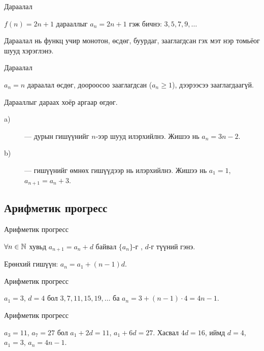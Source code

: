 \begin{frame}[allowframebreaks]{Дараалал}
\begin{example}
$f(n)=2n+1$ дарааллыг $a_n=2n+1$ гэж бичнэ: $3,5,7,9,\ldots$
\end{example}

 Дараалал нь функц учир монотон, өсдөг, буурдаг, зааглагдсан гэх мэт
нэр томьёог шууд хэрэглэнэ.
\end{frame}

\begin{frame}[allowframebreaks]{Дараалал}
\begin{example}
$a_n=n$ дараалал өсдөг, доороосоо зааглагдсан ($a_n\ge1$), дээрээсээ зааглагдаагүй.
\end{example}

Дарааллыг дараах хоёр аргаар өгдөг.
\begin{description}
  \item[a)]  — дурын гишүүнийг $n$-ээр шууд илэрхийлнэ.
            Жишээ нь $a_n=3n-2$.
  \item[b)]  — гишүүнийг өмнөх гишүүдээр нь илэрхийлнэ.
            Жишээ нь $a_1=1$, $a_{n+1}=a_n+3$.
\end{description}
\end{frame}

\subsection{Арифметик прогресс}
\begin{frame}[allowframebreaks]{Арифметик прогресс}
\begin{definition}
$\forall n\in\mathbb{N}$ хувьд $a_{n+1}=a_n+d$ байвал $\{a_n\}$-г ,
$d$-г түүний  гэнэ.
\end{definition}

Ерөнхий гишүүн: $a_n=a_1+(n-1)d$.
\end{frame}

\begin{frame}[allowframebreaks]{Арифметик прогресс}
\begin{example}
$a_1=3$, $d=4$ бол $3,7,11,15,19,\ldots$ ба $a_n=3+(n-1)\cdot4=4n-1$.
\end{example}
\end{frame}

\begin{frame}[allowframebreaks]{Арифметик прогресс}
\begin{example}
$a_3=11$, $a_7=27$ бол $a_1+2d=11$, $a_1+6d=27$. Хасвал $4d=16$, иймд $d=4$, $a_1=3$,
$a_n=4n-1$.
\end{example}
\end{frame}


